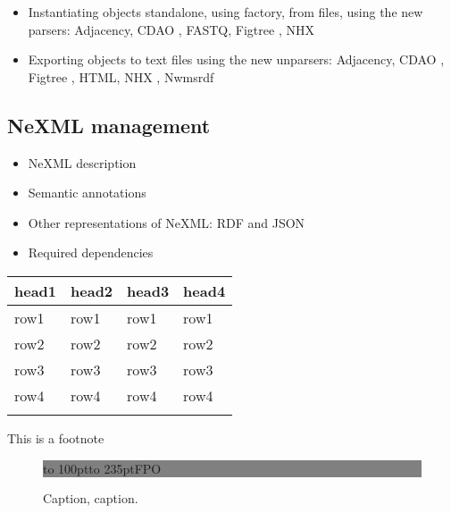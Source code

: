 \documentclass{bioinfo}
\begin{document}
\begin{itemize}
\item Instantiating objects standalone, using factory, from files, using the new parsers: 
Adjacency, CDAO \citep{Prosdocimi2009}, FASTQ, Figtree \citep{Rambaut2007}, 
NHX \citep{Zmasek2001}
\item Exporting objects to text files using the new unparsers: Adjacency, CDAO 
\citep{Prosdocimi2009}, Figtree \citep{Rambaut2007}, HTML, NHX 
\citep{Zmasek2001}, Nwmsrdf
\end{itemize}

\subsection{NeXML management}

\begin{itemize}
\item NeXML description
\item Semantic annotations
\item Other representations of NeXML: RDF and JSON
\item Required dependencies
\end{itemize}

\begin{table}[!t]
 {\begin{tabular}{@{}llll@{}}\toprule head1 &
head2 & head3 & head4\\\midrule
row1 & row1 & row1 & row1\\
row2 & row2 & row2 & row2\\
row3 & row3 & row3 & row3\\
row4 & row4 & row4 & row4\\\botrule
\end{tabular}}{This is a footnote}
\end{table}

\begin{figure}[!tpb]%
\fboxsep=0pt\colorbox{gray}{\begin{minipage}[t]{235pt} \vbox to 100pt{\vfill\hbox to
235pt{\hfill\fontsize{24pt}{24pt}\selectfont FPO\hfill}\vfill}
\end{minipage}}
\caption{Caption, caption.}\label{fig:01}
\end{figure}
\end{document}
